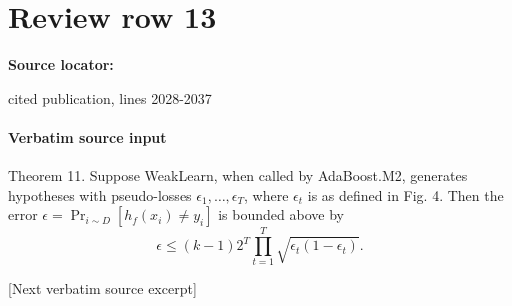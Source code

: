 \documentclass[10pt]{article}
\begin{document}
\section*{Review row 13}
\textbf{Source locator:} {\footnotesize\raggedright cited publication, lines 2028-\allowbreak{}2037\par}
\paragraph{Verbatim source input}
\begin{ReviewVerbatim}
Theorem 11. Suppose WeakLearn, when called by AdaBoost.M2, generates
hypotheses with pseudo-losses $\epsilon_1,\ldots,\epsilon_T$, where
$\epsilon_t$ is as defined in Fig. 4. Then the error
$\epsilon=\Pr_{i\sim D}[h_f(x_i)\neq y_i]$ is bounded above by
$$
\epsilon\leq(k-1)2^T\prod_{t=1}^T\sqrt{\epsilon_t(1-\epsilon_t)}.
$$

[Next verbatim source excerpt]


\end{ReviewVerbatim}
\end{document}
